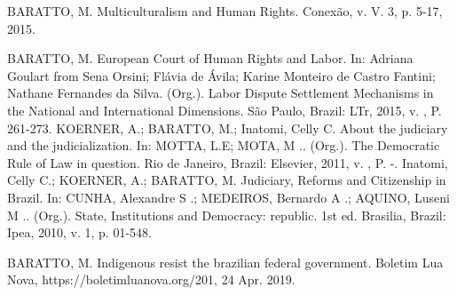 

\begin{cvcitems}
  \cvcitem
    {BARATTO, M.}
    {Multiculturalism and Human Rights. Conexão, v. V. 3, p. 5-17, 2015.}
\end{cvcitems}



\begin{cvcitems}
  \cvcitem
  {BARATTO, M.}
  {European Court of Human Rights and Labor. In: Adriana Goulart from Sena Orsini; Flávia de Ávila; Karine Monteiro de Castro Fantini; Nathane Fernandes da Silva. (Org.). Labor Dispute Settlement Mechanisms in the National and International Dimensions. São Paulo, Brazil: LTr, 2015, v. , P. 261-273.}
  \cvcitem
  {KOERNER, A.; BARATTO, M.; Inatomi, Celly C.}
  {About the judiciary and the judicialization. In: MOTTA, L.E; MOTA, M .. (Org.). The Democratic Rule of Law in question. Rio de Janeiro, Brazil: Elsevier, 2011, v. , P. -.}
  \cvcitem
  {Inatomi, Celly C.; KOERNER, A.; BARATTO, M.}
  {Judiciary, Reforms and Citizenship in Brazil. In: CUNHA, Alexandre S .; MEDEIROS, Bernardo A .; AQUINO, Luseni M .. (Org.). State, Institutions and Democracy: republic. 1st ed. Brasilia, Brazil: Ipea, 2010, v. 1, p. 01-548.}
\end{cvcitems}


\begin{cvcitems}
  \cvcitem
    {BARATTO, M.}
    {Indigenous resist the brazilian federal government. Boletim Lua Nova, https://boletimluanova.org/201, 24 Apr. 2019.}
\end{cvcitems}


